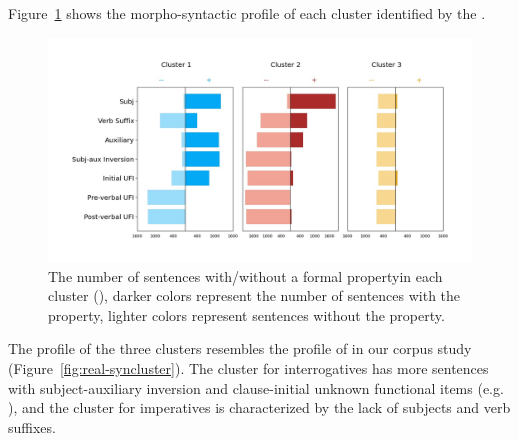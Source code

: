 Figure~\ref{fig:target-syncluster} shows the morpho-syntactic profile of each cluster identified by the \plearnerabbr{}. 

\begin{figure}[H]
    \centering
    \includegraphics[width=1\textwidth]{figures/target-syncluster.jpg}
    \caption{The number of sentences with/without a formal propertyin each cluster (), darker colors represent the number of sentences with the property, lighter colors represent sentences without the property.}
    \label{fig:target-syncluster}
\end{figure}

The profile of the three clusters resembles the profile of \diis{} in our corpus study (Figure~\ref{fig:real-syncluster}). The cluster for interrogatives has more sentences with subject-auxiliary inversion and clause-initial unknown functional items (e.g. \twh{}), and the cluster for imperatives is characterized by the lack of subjects and verb suffixes. 

